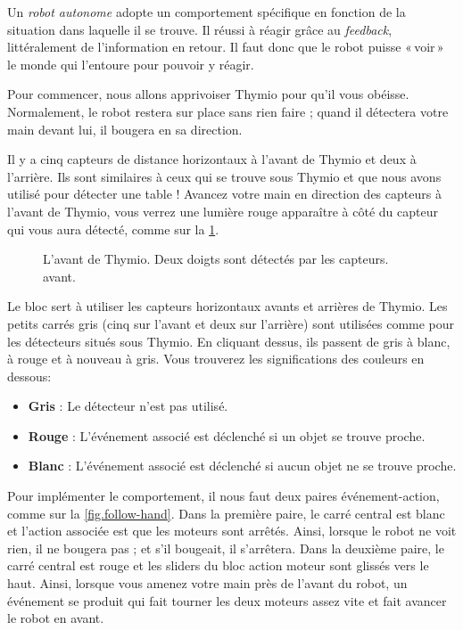 \label{ch.pet}

Un \emph{robot autonome} adopte un comportement spécifique en fonction de la situation dans laquelle il se trouve.
Il réussi à réagir grâce au \textit{feedback}, littéralement de l'information en retour.
Il faut donc que le robot puisse «\,voir\,» le monde qui l'entoure pour pouvoir y réagir.


Pour commencer, nous allons apprivoiser Thymio pour qu'il vous obéisse.
Normalement, le robot restera sur place sans rien faire ; quand il détectera votre main devant lui, il bougera en sa direction.

Il y a cinq capteurs de distance horizontaux à l'avant de Thymio et deux à l'arrière.
Ils sont similaires à ceux qui se trouve sous Thymio et que nous avons utilisé pour détecter une table !
Avancez votre main en direction des capteurs à l'avant de Thymio, vous verrez une lumière rouge apparaître à côté du capteur qui vous aura détecté, comme sur la \cref{fig.detect}.

\begin{figure}
\begin{center}
\caption{L'avant de Thymio. Deux doigts sont détectés par les capteurs. avant.}\label{fig.detect}
\end{center}
\end{figure}

Le bloc  sert à utiliser les capteurs horizontaux avants et arrières de Thymio.
Les petits carrés gris (cinq sur l'avant et deux sur l'arrière) sont utilisées comme pour les détecteurs situés sous Thymio.
En cliquant dessus, ils passent de gris à blanc, à rouge et à nouveau à gris. Vous trouverez les significations des couleurs en dessous:

\begin{itemize}
\item \textbf{Gris} : Le détecteur n'est pas utilisé.
\item \textbf{Rouge} : L'événement associé est déclenché si un objet se trouve proche.
\item \textbf{Blanc} : L'événement associé est déclenché si aucun objet ne se trouve proche.
\end{itemize}

\newpage

Pour implémenter le comportement, il nous faut deux paires événement-action, comme sur la \cref{fig.follow-hand}.
Dans la première paire, le carré central est blanc et l'action associée est que les moteurs sont arrêtés.
Ainsi, lorsque le robot ne voit rien, il ne bougera pas ; et s'il bougeait, il s'arrêtera.
Dans la deuxième paire, le carré central est rouge et les sliders du bloc action moteur sont glissés vers le haut.
Ainsi, lorsque vous amenez votre main près de l'avant du robot, un événement se produit qui fait tourner les deux moteurs assez vite et fait avancer le robot en avant.

